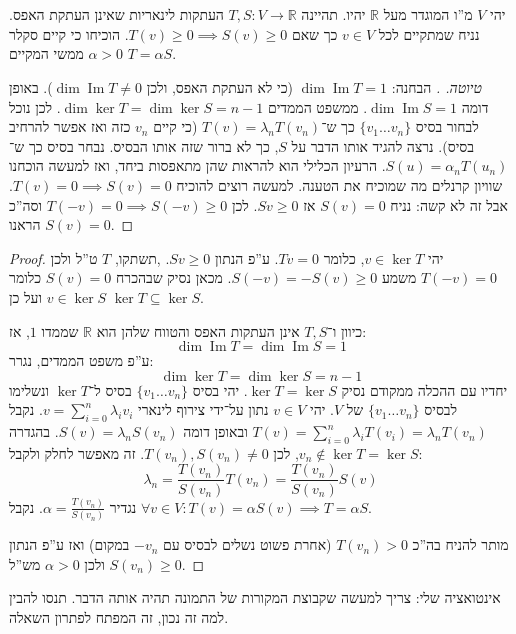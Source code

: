 \documentclass[]{article}
\newcommand\R     {\mathbb{R}}
\DeclareMathOperator\Img   {Im}
\newcommand\sumni     {\sum_{i = 0}^{n}}
\newcommand\co        {\colon}
\newcommand\ag        {\alpha}
\renewcommand\lg      {\lambda}
\theoremstyle{definition}
\begin{document}
	\section{}
	יהי $V$ מ''ו המוגדר מעל $\R$ יהיו. תהיינה $T, S \co V \to \R$ העתקות לינאריות שאינן העתקת האפס. נניח שמתקיים לכל $v \in V$ כך שאם $T(v) \ge 0 \implies S(v) \ge 0$. הוכיחו כי קיים סקלר $\ag > 0$ ממשי המקיים $T = \ag S$. 
	
	\begin{proof}[טיוטה. ]
		הבחנה: $\dim \Img T = 1$ (כי לא העתקת האפס, ולכן $\dim \Img T \neq 0$). באופן דומה $\dim \Img S = 1$. ממשפט הממדים $\dim \ker T = \dim  \ker S = n - 1$. לכן נוכל לבחור בסיס $\{v_1 \dots v_n\}$ כך ש־$T(v) = \lg_nT(v_n)$ (כי קיים $v_n$ כזה ואז אפשר להרחיב בסיס). נרצה להגיד אותו הדבר על $S$, כך לא ברור שזה אותו הבסיס. נבחר בסיס כך ש־$S(u) = \ag_nT(u_n)$. הרעיון הכלילי הוא להראות שהן מתאפסות ביחד, ואז למעשה הוכחנו שוויון קרנלים מה שמוכיח את הטענה. למעשה רוצים להוכיח $T(v) = 0 \implies S(v) = 0$. אבל זה לא קשה: נניח $S(v) = 0$ אז $Sv \ge 0$. לכן $T(-v) = 0 \implies S(-v) \ge 0$ וסה''כ הראנו $S(v) = 0$. 
	\end{proof}
	
	\begin{proof}
		יהי $v \in \ker T$, כלומר $Tv = 0$. ע''פ הנתון $Sv \ge 0$. ,תשתקו, $T$ ט''ל ולכן $T(-v) = 0$ משמע $S(-v) = -S(v) \ge 0$. מכאן נסיק שבהכרח $S(v) = 0$ כלומר $v \in \ker S$ ועל כן $\ker T \subseteq \ker S$. 
		
		כיוון ו־$T, S$ אינן העתקות האפס והטווח שלהן הוא $\R$ שממדו $1$, אז: 
		\[ \dim \Img T = \dim \Img S = 1 \]
		ע''פ משפט הממדים, נגרר: 
		\[ \dim \ker T = \dim \ker S = n - 1 \]
		יחדיו עם ההכלה ממקודם נסיק $\ker T = \ker S$. יהי בסיס $\{v_1 \dots v_n\}$ בסיס ל־$\ker T$ ונשלימו לבסיס $\{v_1 \dots v_n\}$ של $V$. יהי $v \in V$ נתון על־ידי צירוף לינארי $v = \sumni \lg_i v_i$. נקבל $T(v) = \sumni \lg_i T(v_i) = \lg_n T(v_n)$ ובאופן דומה $S(v) = \lg_n S(v_n)$. בהגדרה $v_n \notin \ker T = \ker S$, לכן $T(v_n), S(v_n) \neq 0$. זה מאפשר לחלק ולקבל: 
		\[ \lg_n = \frac{T(v_n)}{S(v_n)}T(v_n) = \frac{T(v_n)}{S(v_n)} S(v) \]
		נגדיר $\ag = \frac{T(v_n)}{S(v_n)}$. נקבל $\forall v \in V\co T(v) = \ag S(v) \implies T = \ag S$. 
		
		מותר להניח בה''כ $T(v_n) > 0$ (אחרת פשוט נשלים לבסיס עם $-v_n$ במקום) ואז ע''פ הנתון $S(v_n) \ge 0$ ולכן $\ag > 0$ מש''ל. 
	\end{proof}
	
	אינטואציה שלי: צריך למעשה שקבוצת המקורות של התמונה תהיה אותה הדבר. תנסו להבין למה זה נכון, זה המפתח לפתרון השאלה. 
	
\end{document}
